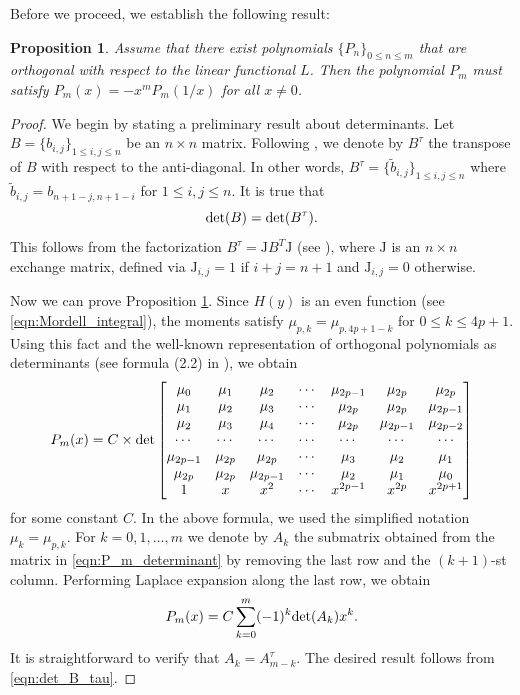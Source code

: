 \documentclass[12pt]{article}
\newtheorem{proposition}{Proposition}
\theoremstyle{definition}
\begin{document}
Before we proceed, we establish the following result:   
\begin{proposition}\label{prop:P_m} Assume that there exist polynomials $\{P_n\}_{0\le n \le m}$ that are orthogonal with respect to the linear functional $L$. Then 
the polynomial $P_m$  must satisfy
$P_m(x)=-x^m P_m(1/x)$ for all $x\neq 0$.
\end{proposition} 
\begin{proof} We begin by stating a preliminary result about determinants. Let $B=\{b_{i,j}\}_{1 \le i,j \le n}$ be an $n\times n$ matrix. Following \cite{Golyshev2007}, we denote by $B^{\tau}$ the transpose of  $B$  with respect to the anti-diagonal. In other words, $B^{\tau}=\{\tilde b_{i,j}\}_{1 \le i,j \le n}$ where $\tilde b_{i,j}=b_{n+1-j,n+1-i}$ for $1\le i,j \le n$. 
It is true that
\begin{equation}\label{eqn:det_B_tau}
{\textnormal{det}}(B) = {\textnormal{det}}(B^{\tau}).
\end{equation} 
This follows from the factorization $B^{\tau}={\textrm{J}} B^T {\textrm{J}}$ (see \cite{Golyshev2007}), where ${\textrm{J}}$ is an $n\times n$ exchange matrix, defined via ${\textrm{J}}_{i,j}=1$ if $i+j=n+1$ and ${\textrm{J}}_{i,j}=0$ otherwise. 

Now we can prove Proposition \ref{prop:P_m}. Since $H(y)$ is an even function (see \eqref{eqn:Mordell_integral}),   the moments  satisfy $\mu_{p,k}=\mu_{p,4p+1-k}$ for $0\le k \le 4p+1$. Using this fact and the well-known representation of orthogonal polynomials as determinants (see formula (2.2) in \cite{MARCELLAN2001}), we obtain
\begin{equation}\label{eqn:P_m_determinant}
P_m(x)= C \times  {\textnormal{det}}\begin{bmatrix}
\mu_0 & \mu_1 & \mu_2 & \cdots & \mu_{2p-1} &  \mu_{2p} & \mu_{2p} \\
\mu_1 & \mu_2 & \mu_3 & \cdots & \mu_{2p} & \mu_{2p} & \mu_{2p-1} \\
\mu_2 & \mu_3 & \mu_4 & \cdots & \mu_{2p} & \mu_{2p-1} & \mu_{2p-2} \\
\cdots  & \cdots  & \cdots  &   \cdots & \cdots & \cdots  & \cdots  \\
\mu_{2p-1} & \mu_{2p} & \mu_{2p}  & \cdots &\mu_{3} &\mu_{2} & \mu_{1} \\
\mu_{2p} & \mu_{2p} & \mu_{2p-1}  & \cdots &\mu_{2} &\mu_{1} & \mu_{0} \\
1 & x & x^2 & \cdots & x^{2p-1} & x^{2p} & x^{2p+1} 
\end{bmatrix}
\end{equation}
for some constant $C$. In the above formula, we used the simplified notation $\mu_k=\mu_{p,k}$. 
For $k=0,1,\dots,m$ we denote by $A_k$ the submatrix obtained from the matrix in \eqref{eqn:P_m_determinant} by removing the last row and the $(k+1)$-st column.  Performing Laplace expansion along the last row, we obtain
$$
P_m(x)=C \sum\limits_{k=0}^{m} (-1)^k {\textnormal{det}}(A_k) x^k. 
$$
It is straightforward  to verify that $A_k=A_{m-k}^{\tau}$. The desired result follows from \eqref{eqn:det_B_tau}.   
\end{proof}
\end{document}
